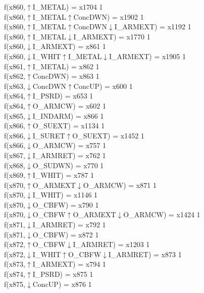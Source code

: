 f(x860,$\uparrow$I\_METAL) = x1704 {1} \\
f(x860,$\uparrow$I\_METAL$\uparrow$ConcDWN) = x1902 {1} \\
f(x860,$\uparrow$I\_METAL$\uparrow$ConcDWN$\downarrow$I\_ARMEXT) = x1192 {1} \\
f(x860,$\uparrow$I\_METAL$\downarrow$I\_ARMEXT) = x1770 {1} \\
f(x860,$\downarrow$I\_ARMEXT) = x861 {1} \\
f(x860,$\downarrow$I\_WHIT$\uparrow$I\_METAL$\downarrow$I\_ARMEXT) = x1905 {1} \\
f(x861,$\uparrow$I\_METAL) = x862 {1} \\
f(x862,$\uparrow$ConcDWN) = x863 {1} \\
f(x863,$\downarrow$ConcDWN$\uparrow$ConcUP) = x600 {1} \\
f(x864,$\uparrow$I\_PSRD) = x653 {1} \\
f(x864,$\uparrow$O\_ARMCW) = x602 {1} \\
f(x865,$\downarrow$I\_INDARM) = x866 {1} \\
f(x866,$\uparrow$O\_SUEXT) = x1134 {1} \\
f(x866,$\downarrow$I\_SURET$\uparrow$O\_SUEXT) = x1452 {1} \\
f(x866,$\downarrow$O\_ARMCW) = x757 {1} \\
f(x867,$\downarrow$I\_ARMRET) = x762 {1} \\
f(x868,$\downarrow$O\_SUDWN) = x770 {1} \\
f(x869,$\uparrow$I\_WHIT) = x787 {1} \\
f(x870,$\uparrow$O\_ARMEXT$\downarrow$O\_ARMCW) = x871 {1} \\
f(x870,$\downarrow$I\_WHIT) = x1146 {1} \\
f(x870,$\downarrow$O\_CBFW) = x790 {1} \\
f(x870,$\downarrow$O\_CBFW$\uparrow$O\_ARMEXT$\downarrow$O\_ARMCW) = x1424 {1} \\
f(x871,$\downarrow$I\_ARMRET) = x792 {1} \\
f(x871,$\downarrow$O\_CBFW) = x872 {1} \\
f(x872,$\uparrow$O\_CBFW$\downarrow$I\_ARMRET) = x1203 {1} \\
f(x872,$\downarrow$I\_WHIT$\uparrow$O\_CBFW$\downarrow$I\_ARMRET) = x873 {1} \\
f(x873,$\uparrow$I\_ARMEXT) = x794 {1} \\
f(x874,$\uparrow$I\_PSRD) = x875 {1} \\
f(x875,$\downarrow$ConcUP) = x876 {1} \\
